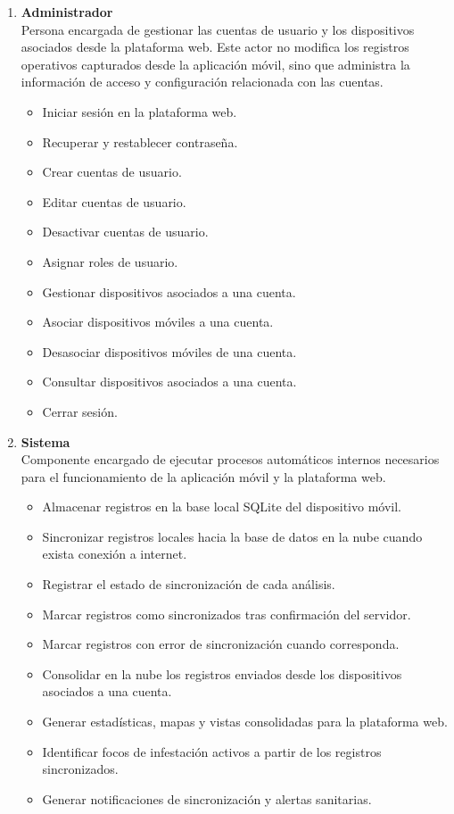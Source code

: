 \begin{enumerate}
    \item \textbf{Administrador}\\
    Persona encargada de gestionar las cuentas de usuario y los dispositivos asociados desde la plataforma web. Este actor no modifica los registros operativos capturados desde la aplicación móvil, sino que administra la información de acceso y configuración relacionada con las cuentas.
        \begin{itemize}
            \item Iniciar sesión en la plataforma web.
            \item Recuperar y restablecer contraseña.
            \item Crear cuentas de usuario.
            \item Editar cuentas de usuario.
            \item Desactivar cuentas de usuario.
            \item Asignar roles de usuario.
            \item Gestionar dispositivos asociados a una cuenta.
            \item Asociar dispositivos móviles a una cuenta.
            \item Desasociar dispositivos móviles de una cuenta.
            \item Consultar dispositivos asociados a una cuenta.
            \item Cerrar sesión.
        \end{itemize}

    \item \textbf{Sistema}\\
    Componente encargado de ejecutar procesos automáticos internos necesarios para el funcionamiento de la aplicación móvil y la plataforma web.
        \begin{itemize}
            \item Almacenar registros en la base local SQLite del dispositivo móvil.
            \item Sincronizar registros locales hacia la base de datos en la nube cuando exista conexión a internet.
            \item Registrar el estado de sincronización de cada análisis.
            \item Marcar registros como sincronizados tras confirmación del servidor.
            \item Marcar registros con error de sincronización cuando corresponda.
            \item Consolidar en la nube los registros enviados desde los dispositivos asociados a una cuenta.
            \item Generar estadísticas, mapas y vistas consolidadas para la plataforma web.
            \item Identificar focos de infestación activos a partir de los registros sincronizados.
            \item Generar notificaciones de sincronización y alertas sanitarias.
        \end{itemize}
\end{enumerate}




